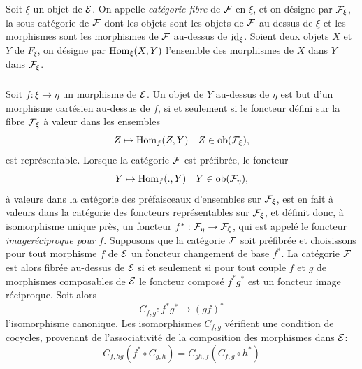 \documentclass[10pt]{../fichiers-configuration-latex/smfart}
\begin{document}
\setcounter{subsection}{1}
\subsubsection{}

Soit $\xi$ un objet de ${\mathcal E}$. On appelle \emph{catégorie
  fibre} de ${\mathcal F}$ en $\xi$, et on désigne par
  ${\mathcal F}_{\xi}$, la sous-catégorie de ${\mathcal F}$ dont les
  objets sont les objets de ${\mathcal F}$ au-dessus de $\xi$ et les
  morphismes sont les morphismes de ${\mathcal F}$ au-dessus de
  $\operatorname{id}_{\xi}$. Soient deux objets $X$ et $Y$ de $F_{\xi}$, on désigne
  par $\operatorname{Hom}_{\xi} (X, Y)$ l'ensemble des morphismes de $X$ dans $Y$
  dans ${\mathcal F}_{\xi}$.

\subsubsection{}

Soit $f : \xi \to \eta$ un morphisme de ${\mathcal E}$. Un objet de $Y$
au-dessus de $\eta$ est but d'un morphisme cartésien au-dessus de $f$,
si et seulement si le foncteur défini sur la fibre ${\mathcal F}_{\xi}$
à valeur dans les ensembles
$$
Z \mapsto \operatorname{Hom}_f(Z, Y)\quad Z \in \operatorname{ob} ({\mathcal F}_{\xi}){},
$$
est représentable. Lorsque la catégorie ${\mathcal F}$  est préfibrée,
le foncteur
$$
Y \mapsto \operatorname{Hom}_f(., Y)\quad Y \in \operatorname{ob} ({\mathcal F}_{\eta}){},
$$
à valeurs dans la catégorie des préfaisceaux d'ensembles sur
${\mathcal F}_{\xi}$, est en fait à valeurs dans la catégorie des
foncteurs représentables sur ${\mathcal F}_{\xi}$, et définit donc, à
isomorphisme unique près, un foncteur $f^{\ast} : \Ff_{\eta} \to
\Ff_{\xi}$, qui est appelé le foncteur \emph{image\pageoriginale réciproque
   pour} $f$. Supposons que la catégorie ${\mathcal F}$
soit préfibrée et choisissons pour tout morphisme $f$ de ${\mathcal E}$ un foncteur
changement de base $f^{\ast}$. La catégorie ${\mathcal F}$ est alors
fibrée au-dessus de ${\mathcal E}$ si et seulement si pour tout couple
$f$ et $g$ de morphismes composables de ${\mathcal E}$ le foncteur
composé $f^{\ast}g^{\ast}$ est un foncteur image réciproque. Soit
alors
\begin{equation*}
C_{f, g} : f^{\ast} g^{\ast} \to (gf)^{\ast}\tag{6.1.2.1}
\end{equation*}
l'isomorphisme canonique. Les isomorphismes $C_{f,g}$ vérifient une
condition de cocycles, provenant de l'associativité de la composition
des morphismes dans ${\mathcal E}$:
\begin{equation*}
C_{f, hg}(f^{\ast} \circ C_{g, h}) = C_{gh, f}(C_{f, g} \circ h^{\ast})\tag{6.1.2.2}
\end{equation*}
\end{document}
